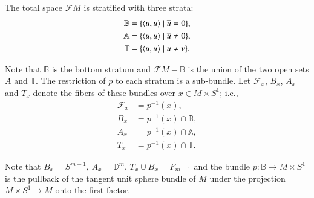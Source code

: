 The total space $\mathcal{F}M$ is stratified with three strata:
\begin{align*}
  \mathbb{B} & = \{\langle u, u\rangle \mid \overline{u} =0 \},\\
  \mathbb{A} & = \{\langle u, u\rangle \mid \overline{u} \neq 0 \},\\
  \mathbb{T} & = \{\langle u, u\rangle \mid {u} \neq v \}.
\end{align*}

Note that $\mathbb{B}$ is the bottom stratum and $\mathcal{F} M -
\mathbb{B}$ is the union of the two open sets $A$ and
$\mathbb{T}$. The restriction of $p$ to each stratum is a
sub-bundle. Let $\mathcal{F}_x$, $B_x$, $A_x$ and $T_x$ denote the
fibers of these bundles over $x \in M \times S^1$; i.e., 
\begin{align*}
  \mathcal{F}_x & = p^{-1} (x),\\
  B_x & = p^{-1} (x) \cap \mathbb{B},\\
  A_x & = p^{-1} (x) \cap \mathbb{A},\\
  T_x & = p^{-1} (x) \cap \mathbb{T}.
\end{align*}

Note that $B_x = S^{m-1}$, $A_x = \mathbb{D}^m$, $T_x \cup B_x=
F_{m-1}$ and the bundle $p : \mathbb{B} \to M \times S^1$ is the
pullback of the tangent unit sphere bundle of $M$ under the projection
$M \times S^1 \to M$ onto the first factor.

